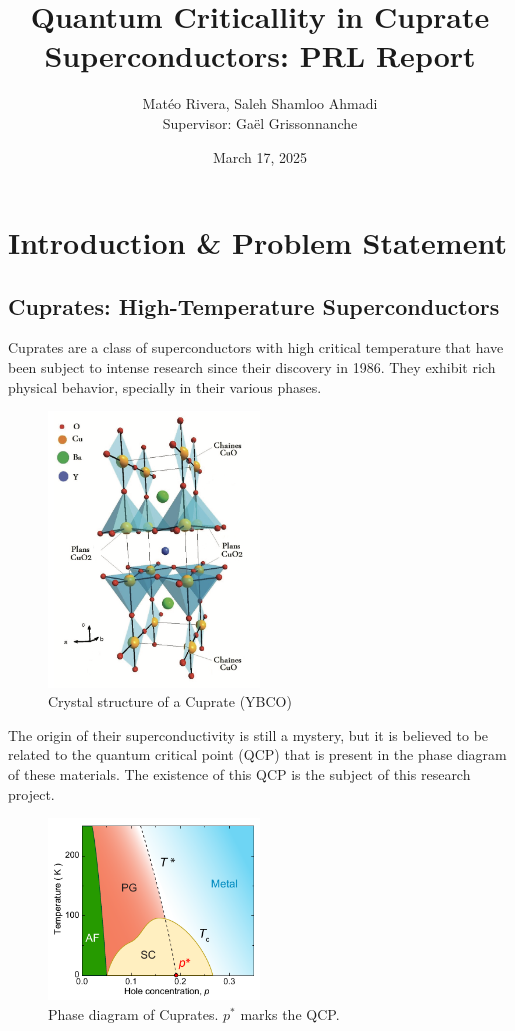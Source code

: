 \documentclass[12pt]{article}
\title{Quantum Criticallity in Cuprate Superconductors: PRL Report}
\author{Matéo Rivera, Saleh Shamloo Ahmadi\\Supervisor: Gaël Grissonnanche}
\date{March 17, 2025}
\begin{document}
\maketitle
\section{Introduction \& Problem Statement}
\subsection{Cuprates: High-Temperature Superconductors}
Cuprates are a class of superconductors with high critical temperature that have been subject
to intense research since their discovery in 1986. They exhibit rich physical behavior, specially
in their various phases.

\begin{figure}
    \centering
    \includegraphics[width=0.5\textwidth]{figures/cuprate_structure}
    \caption{Crystal structure of a Cuprate (YBCO)}
    \label{fig:cuprate_structure}
\end{figure}

The origin of their superconductivity is still a mystery, but it is believed to be related to the
quantum critical point (QCP) that is present in the phase diagram of these materials. The existence
of this QCP is the subject of this research project.

\begin{figure}
    \centering
    \includegraphics[width=0.5\textwidth]{figures/phase_diagram}
    \caption{Phase diagram of Cuprates. $p^*$ marks the QCP.}
    \label{fig:phase_diagram}
\end{figure}
\end{document}
